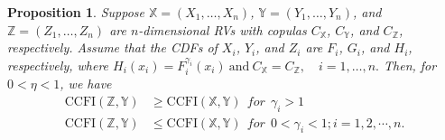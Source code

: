 \documentclass[12pt, a4paper]{article}
\numberwithin{equation}{section}
\newtheorem{proposition}{Proposition}[section]
\begin{document}
\begin{proposition}\label{prop3.2}
Suppose \(\mathbb{X} = (X_1, \dots, X_n)\), \(\mathbb{Y} = (Y_1, \dots, Y_n)\), and \(\mathbb{Z} = (Z_1, \dots, Z_n)\) are \(n\)-dimensional RVs with copulas \(C_{\mathbb{X}}\), \(C_{\mathbb{Y}}\), and \(C_{\mathbb{Z}}\), respectively. Assume that the CDFs of \(X_i\), \(Y_i\), and \(Z_i\) are \(F_i\), \(G_i\), and \(H_i\), respectively, where  
$
H_i(x_i) = F_i^{\gamma_i}(x_i)~\text{and}~C_{\mathbb{X}} = C_{\mathbb{Z}}, \quad i = 1, \dots, n.
$
Then, for \(0 < \eta < 1\), we have  
\begin{align*}
	\text{CCFI}(\mathbb{Z}, \mathbb{Y}) &\ge \text{CCFI}(\mathbb{X}, \mathbb{Y})~~for~~\gamma_i>1\\
	  	\text{CCFI}(\mathbb{Z}, \mathbb{Y}) &\le \text{CCFI}(\mathbb{X}, \mathbb{Y})~~for~~0<\gamma_i<1; i=1,2,\cdots,n.
\end{align*}  
\end{proposition}
\end{document}
